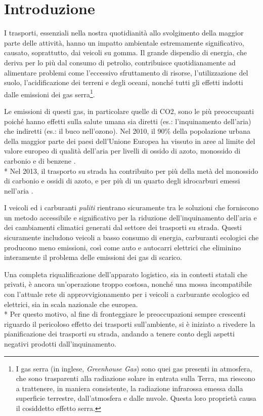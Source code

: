 \clearpage{\pagestyle{empty}\cleardoublepage}
\chapter{Introduzione}\label{ch:introduzione}

I trasporti, essenziali nella nostra quotidianità allo svolgimento della maggior parte delle attività, hanno un impatto ambientale estremamente significativo, causato, soprattutto, dai veicoli su gomma. Il grande dispendio di energia, che deriva per lo più dal consumo di petrolio, contribuisce quotidianamente ad alimentare problemi come l’eccessivo sfruttamento di risorse, l’utilizzazione del suolo, l’acidificazione dei terreni e degli oceani, nonché tutti gli effetti indotti dalle emissioni dei gas serra\footnote{I gas serra (in inglese, \emph{Greenhouse Gas}) sono quei gas presenti in atmosfera, che sono trasparenti alla radiazione solare in entrata sulla Terra, ma riescono a trattenere, in maniera consistente, la radiazione infrarossa emessa dalla superficie terrestre, dall'atmosfera e dalle nuvole. Questa loro proprietà causa il cosiddetto effetto serra.}.

Le emissioni di questi gas, in particolare quelle di CO2, sono le più preoccupanti poiché hanno effetti sulla salute umana sia diretti (es.: l’inquinamento dell’aria) che indiretti (es.: il buco nell’ozono). Nel 2010, il 90\% della popolazione urbana della maggior parte dei paesi  dell’Unione Europea ha vissuto in aree al limite del valore europeo di qualità dell’aria per livelli di ossido di azoto, monossido di carbonio e di benzene \cite{effects-of-pollution}. \\*
Nel 2013, il trasporto su strada ha contribuito per più della metà del monossido di carbonio e ossidi di azoto, e per più di un quarto degli idrocarburi emessi nell’aria \cite{trucks-pollution}.

I veicoli ed i carburanti \emph{puliti} rientrano sicuramente tra le soluzioni che forniscono un metodo accessibile e significativo per la riduzione dell’inquinamento dell’aria e dei cambiamenti climatici generati dal settore dei trasporti su strada. Questi sicuramente includono veicoli a basso consumo di energia, carburanti ecologici che producono meno emissioni, così come auto e autocarri elettrici che eliminino interamente il problema delle emissioni dei gas di scarico.

Una completa riqualificazione dell’apparato logistico, sia in contesti statali che privati, è ancora un’operazione troppo costosa, nonché una mossa incompatibile con l’attuale rete di approvvigionamento per i veicoli a carburante ecologico ed elettrici, sia in scala nazionale che europea. \\*
Per questo motivo, al fine di fronteggiare le preoccupazioni sempre crescenti riguardo il pericoloso effetto dei trasporti sull’ambiente, si è iniziato a rivedere la pianificazione dei trasporti su strada, andando a tenere conto degli aspetti negativi prodotti dall’inquinamento.


